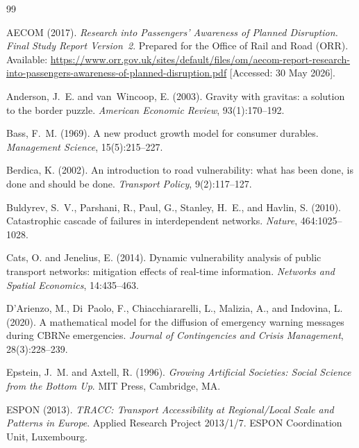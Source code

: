 \documentclass[12pt,a4paper]{article}
\begin{document}
\begin{thebibliography}{99}

AECOM (2017).
\textit{Research into Passengers' Awareness of Planned Disruption.
Final Study Report Version~2}.
Prepared for the Office of Rail and Road (ORR).
Available: \url{https://www.orr.gov.uk/sites/default/files/om/aecom-report-research-into-passengers-awareness-of-planned-disruption.pdf}
[Accessed: 30 May 2026].

Anderson, J.~E. and van~Wincoop, E. (2003).
Gravity with gravitas: a solution to the border puzzle.
\textit{American Economic Review}, 93(1):170--192.

Bass, F.~M. (1969).
A new product growth model for consumer durables.
\textit{Management Science}, 15(5):215--227.

Berdica, K. (2002).
An introduction to road vulnerability: what has been done, is done and should be done.
\textit{Transport Policy}, 9(2):117--127.


Buldyrev, S.~V., Parshani, R., Paul, G., Stanley, H.~E., and Havlin, S. (2010).
Catastrophic cascade of failures in interdependent networks.
\textit{Nature}, 464:1025--1028.

Cats, O. and Jenelius, E. (2014).
Dynamic vulnerability analysis of public transport networks: mitigation effects of
real-time information.
\textit{Networks and Spatial Economics}, 14:435--463.

D'Arienzo, M., Di~Paolo, F., Chiacchiararelli, L., Malizia, A., and Indovina, L. (2020).
A mathematical model for the diffusion of emergency warning messages during {CBRNe} emergencies.
\textit{Journal of Contingencies and Crisis Management}, 28(3):228--239.

Epstein, J.~M. and Axtell, R. (1996).
\textit{Growing Artificial Societies: Social Science from the Bottom Up}.
MIT Press, Cambridge, MA.

ESPON (2013).
\textit{{TRACC}: Transport Accessibility at Regional/Local Scale and Patterns in Europe}.
Applied Research Project 2013/1/7.
ESPON Coordination Unit, Luxembourg.


\end{thebibliography}
\end{document}
